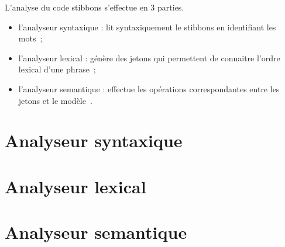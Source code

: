 L'analyse du code stibbons s'effectue en 3 parties.

\begin{itemize}
\item l'analyseur syntaxique : lit syntaxiquement le stibbons en identifiant les mots~;
\item l'analyseur lexical : génère des jetons qui permettent de connaitre l'ordre lexical d'une phrase~;
\item l'analyseur semantique : effectue les opérations correspondantes entre les jetons et le modèle~.
\end{itemize}

\section{Analyseur syntaxique}


\section{Analyseur lexical}


\section{Analyseur semantique}

